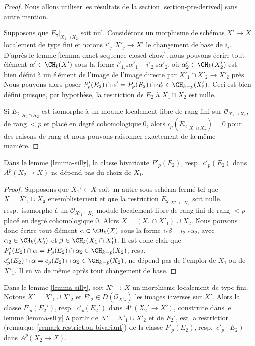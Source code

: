 \begin{proof}
Nous allons utiliser les résultats de la section \ref{section-pre-derived}
sans autre mention.

\medskip\noindent
Supposons que $E_2|_{X_1 \cap X_2}$ soit nul.
Considérons un morphisme de schémas $X' \to X$
localement de type fini et notons $i'_j : X'_j \to X'$ le
changement de base de $i_j$. D'après le lemme \ref{lemma-exact-sequence-closed-chow},
nous pouvons écrire tout élément $\alpha' \in \CH_k(X')$ sous la forme
$i'_{1, *}\alpha'_1 + i'_{2, *}\alpha'_2$, où
$\alpha'_2 \in \CH_k(X'_2)$
est bien défini à un élément de l'image de l'image directe
par $X'_1 \cap X'_2 \to X'_2$ près. Nous pouvons alors poser
$P'_p(E_2) \cap \alpha' = P_p(E_2) \cap \alpha'_2 \in \CH_{k - p}(X'_2)$. Ceci
est bien défini puisque, par hypothèse, la restriction de $E_2$
à $X_1 \cap X_2$ est nulle.

\medskip\noindent
Si $E_2|_{X_1 \cap X_2}$ est isomorphe à un module localement libre de rang fini
sur $\mathcal{O}_{X_1 \cap X_2}$, de rang $< p$ et placé en
degré cohomologique $0$, alors $c_p(E_2|_{X_1 \cap X_2}) = 0$
pour des raisons de rang et nous pouvons raisonner exactement de la même manière.
\end{proof}

\begin{lemma}
\label{lemma-silly-independent}
Dans le lemme \ref{lemma-silly}, la classe bivariante
$P'_p(E_2)$, resp.\ $c'_p(E_2)$ dans $A^p(X_2 \to X)$
ne dépend pas du choix de $X_1$.
\end{lemma}

\begin{proof}
Supposons que $X_1' \subset X$ soit un autre sous-schéma fermé tel que
$X = X'_1 \cup X_2$ ensemblistement et que la restriction
$E_2|_{X'_1 \cap X_2}$ soit nulle, resp.\ isomorphe à un
$\mathcal{O}_{X'_1 \cap X_2}$-module localement libre de rang fini
de rang $< p$ placé en degré cohomologique $0$.
Alors $X = (X_1 \cap X'_1) \cup X_2$. Nous pouvons donc écrire
tout élément $\alpha \in \CH_k(X)$ sous la forme $i_*\beta + i_{2, *}\alpha_2$, avec
$\alpha_2 \in \CH_k(X'_2)$ et $\beta \in \CH_k(X_1 \cap X'_1)$.
Il est donc clair que
$P'_p(E_2) \cap \alpha = P_p(E_2) \cap \alpha_2 \in \CH_{k - p}(X_2)$,
resp.\  $c'_p(E_2) \cap \alpha = c_p(E_2) \cap \alpha_2 \in \CH_{k - p}(X_2)$,
ne dépend pas de l'emploi de $X_1$ ou de $X'_1$. Il en va de même
après tout changement de base.
\end{proof}

\begin{lemma}
\label{lemma-base-change-silly}
Dans le lemme \ref{lemma-silly}, soit $X' \to X$ un morphisme
localement de type fini. Notons $X' = X'_1 \cup X'_2$
et $E'_2 \in D(\mathcal{O}_{X'_2})$ les images inverses sur $X'$.
Alors la classe $P'_p(E_2')$, resp.\ $c'_p(E_2')$ dans
$A^p(X_2' \to X')$, construite dans le lemme \ref{lemma-silly} à partir de
$X' = X'_1 \cup X'_2$ et de $E_2'$, est la restriction
(remarque \ref{remark-restriction-bivariant})
de la classe $P'_p(E_2)$, resp.\ $c'_p(E_2)$ dans $A^p(X_2 \to X)$.
\end{lemma}

